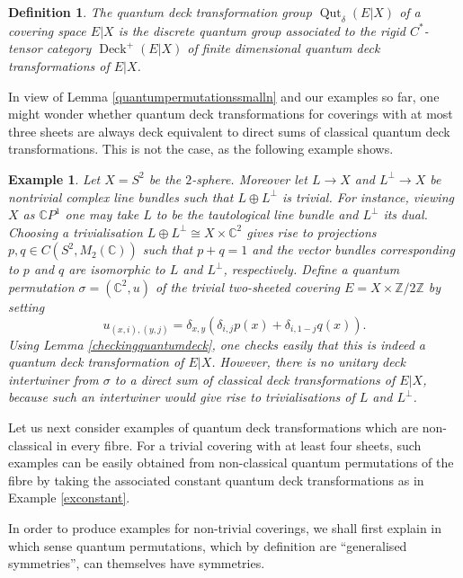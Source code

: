 \documentclass[a4paper]{amsart}
\DeclareMathOperator{\Deck}{Deck}
\DeclareMathOperator{\Qut}{Qut}
\numberwithin{equation}{section}
\theoremstyle{change}
\newtheorem{definition}[theorem]{Definition}
\newtheorem{example}[theorem]{Example}
\begin{document}
\begin{definition} \label{defqdeck}
The quantum deck transformation group $ \Qut_\delta(E|X) $ of a covering space $ E|X $ is the discrete quantum group associated to the rigid $ C^* $-tensor category $ \Deck^+(E|X) $ of finite dimensional quantum deck transformations of $ E|X $. 
\end{definition} 

In view of Lemma \ref{quantumpermutationssmalln} and our examples so far, one might wonder whether quantum deck transformations for coverings with at most three sheets are always deck equivalent to direct sums of classical quantum deck transformations. This is not the case, as the following example shows.

\begin{example} \label{extwosphere}
Let $ X = S^2 $ be the $ 2 $-sphere. Moreover let $ L \rightarrow X $ and $ L^\perp \rightarrow X $ be nontrivial complex line bundles such that $ L \oplus L^\perp $ is trivial. For instance, viewing $ X $ as $ \mathbb{C}P^1 $ one may take $ L $ to be the tautological line bundle and $ L^\perp $ its dual. 
Choosing a trivialisation $ L \oplus L^\perp \cong X \times \mathbb{C}^2 $ gives rise to projections $ p, q \in C(S^2, M_2(\mathbb{C}))$ such that $ p + q = 1 $ and the vector bundles corresponding to $ p $ and $ q $ are isomorphic to $ L $ and $ L^\perp $, respectively. 
Define a quantum permutation $ \sigma = (\mathbb{C}^2, u) $ of the trivial two-sheeted covering $ E = X \times \mathbb{Z}/2 \mathbb{Z} $ by setting 
$$
u_{(x,i), (y,j)} = \delta_{x,y}(\delta_{i,j} p(x) + \delta_{i, 1 - j} q(x)).  
$$
Using Lemma \ref{checkingquantumdeck}, one checks easily that this is indeed a quantum deck transformation of $ E|X $. However, there is no unitary deck intertwiner from $ \sigma $ to a direct sum of classical deck transformations of $ E|X $, because such an intertwiner would give rise to trivialisations of $ L $ and $ L^\perp $. 
\end{example}

Let us next consider examples of quantum deck transformations which are non-classical in every fibre. For a trivial covering with at least four sheets, such examples can be easily obtained from non-classical quantum permutations of the fibre by taking the associated constant quantum deck transformations as in Example \ref{exconstant}.  

In order to produce examples for non-trivial coverings, we shall first explain in which sense quantum permutations, which by definition are ``generalised symmetries'', can themselves have symmetries.  
\end{document}
